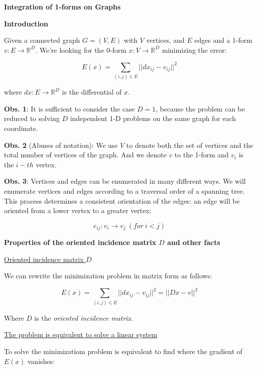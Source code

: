 \documentclass[a4paper,11pt]{article}
\begin{document}
\textbf{Integration of 1-forms on Graphs}

\bigskip

\textbf{Introduction}

\bigskip

Given a connected graph $G=(V,E)$ with $V$ vertices, and $E$ edges and a 
1-form $v: E \rightarrow \mathbb{R}^D$. We're looking for the 0-form 
$x: V \rightarrow \mathbb{R}^D$ minimizing the error:

$$E(x) = \sum_{(i,j) \in E} ||dx_{ij} - v_{ij}||^2$$

where $dx: E \rightarrow \mathbb{R}^D$ is the differential of $x$.

\bigskip

\textbf{Obs. 1}: It is sufficient to consider the case $D=1$, because 
the problem can be reduced to solving $D$ independent 1-D problems on 
the same graph for each coordinate.

\bigskip

\textbf{Obs. 2} (Abuses of notation): We use $V$ to denote both the set 
of vertices and the total number of vertices of the graph. And we denote 
$v$ to the 1-form and $v_i$ is the $i-th$ vertex.

\bigskip

\textbf{Obs. 3}: Vertices and edges can be enumerated in many different 
ways. We will enumerate vertices and edges according to a traversal 
order of a spanning tree. This process determines a consistent 
orientation of the edges: an edge will be oriented from a lower vertex 
to a greater vertex:

$$e_{ij}: v_i \rightarrow v_j \ (for \ i < j)$$

\bigskip


\textbf{Properties of the oriented incidence matrix $D$ and other facts}

\bigskip

\underline{Oriented incidence matrix $D$}

\bigskip

We can rewrite the minimization problem in matrix form as follows:

$$E(x) = \sum_{(i,j) \in E} ||dx_{ij} - v_{ij}||^2 = || D x - v||^2$$

Where $D$ is the \emph{oriented incidence matrix}. 

\bigskip

\underline{The problem is equivalent to solve a linear system}

\bigskip

To solve the minimizatiom problem is equivalent to find where the 
gradient of $E(x)$ vanishes:
 
\end{document}
